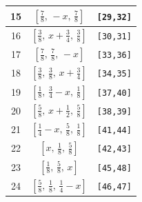 \documentclass[fleqn,8pt]{jsarticle}
\begin{document}
\begin{longtable}{ccc}
15 & $\left[ \frac{7}{8},\, - x,\, \frac{7}{8} \right]$ & {\tt [29,32]} \\ \hline
16 & $\left[ \frac{3}{8},\, x + \frac{3}{4},\, \frac{3}{8} \right]$ & {\tt [30,31]} \\ \hline
17 & $\left[ \frac{7}{8},\, \frac{7}{8},\, - x \right]$ & {\tt [33,36]} \\ \hline
18 & $\left[ \frac{3}{8},\, \frac{3}{8},\, x + \frac{3}{4} \right]$ & {\tt [34,35]} \\ \hline
19 & $\left[ \frac{1}{8},\, \frac{3}{4} - x,\, \frac{1}{8} \right]$ & {\tt [37,40]} \\ \hline
20 & $\left[ \frac{5}{8},\, x + \frac{1}{2},\, \frac{5}{8} \right]$ & {\tt [38,39]} \\ \hline
21 & $\left[ \frac{1}{4} - x,\, \frac{5}{8},\, \frac{1}{8} \right]$ & {\tt [41,44]} \\ \hline
22 & $\left[ x,\, \frac{1}{8},\, \frac{5}{8} \right]$ & {\tt [42,43]} \\ \hline
23 & $\left[ \frac{1}{8},\, \frac{5}{8},\, x \right]$ & {\tt [45,48]} \\ \hline
24 & $\left[ \frac{5}{8},\, \frac{1}{8},\, \frac{1}{4} - x \right]$ & {\tt [46,47]} \\
\end{longtable}
\renewcommand{\arraystretch}{1.2}
\end{document}
